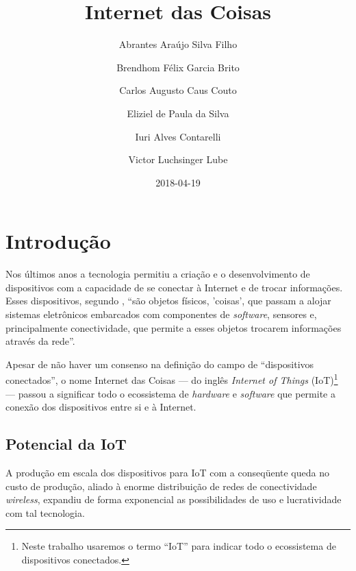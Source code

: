 \documentclass[pdftex, brazil, 12pt, twoside]{article}
\newcommand{\ingles}[1]{\textit{#1}}
\begin{document}
\title{Internet das Coisas}
\author{Abrantes Araújo Silva Filho \and Brendhom Félix Garcia Brito
  \and Carlos Augusto Caus Couto \and Eliziel de Paula da Silva \and Iuri Alves Contarelli
  \and Victor Luchsinger Lube}
\date{2018-04-19}
\maketitle
\tableofcontents


\section{Introdução}
\label{intro}

Nos últimos anos a tecnologia permitiu a criação e o desenvolvimento de dispositivos com a
capacidade de se conectar à Internet e de trocar informações. Esses dispositivos,
segundo \citet{BarbozaTCCIoT2015}, ``são objetos físicos, 'coisas', que passam
a alojar sistemas eletrônicos embarcados com componentes de \ingles{software},
sensores e, principalmente conectividade, que permite a esses objetos trocarem
informações através da rede''.

Apesar de não haver um consenso na definição do campo de ``dispositivos conectados'',
o nome Internet das Coisas --- do inglês \ingles{Internet of Things} (IoT)\footnote{Neste trabalho
  usaremos o termo ``IoT'' para indicar todo o ecossistema de dispositivos conectados.} --- passou
a significar todo o ecossistema de \ingles{hardware} e \ingles{software} que
permite a conexão dos dispositivos entre si e à Internet.


\subsection{Potencial da IoT}
\label{intro-potencial}

A produção em escala dos dispositivos para IoT com a conseqüente queda no custo
de produção, aliado à enorme distribuição de redes de conectividade \ingles{wireless},
expandiu de forma exponencial as possibilidades de uso e lucratividade com
tal tecnologia.
\end{document}
